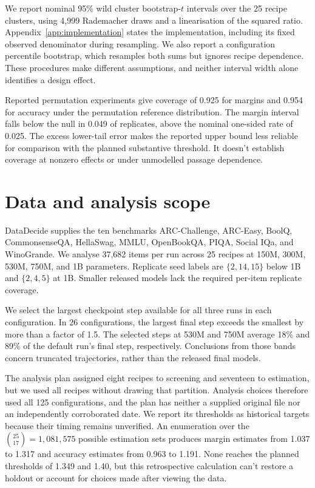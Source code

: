 \documentclass{article}
\begin{document}
We report nominal 95\% wild cluster bootstrap-$t$ intervals over the 25 recipe clusters, using 4,999 Rademacher draws and a linearisation of the squared ratio. Appendix~\ref{app:implementation} states the implementation, including its fixed observed denominator during resampling. We also report a configuration percentile bootstrap, which resamples both sums but ignores recipe dependence. These procedures make different assumptions, and neither interval width alone identifies a design effect.

Reported permutation experiments give coverage of 0.925 for margins and 0.954 for accuracy under the permutation reference distribution. The margin interval falls below the null in 0.049 of replicates, above the nominal one-sided rate of 0.025. The excess lower-tail error makes the reported upper bound less reliable for comparison with the planned substantive threshold. It doesn't establish coverage at nonzero effects or under unmodelled passage dependence.

\section{Data and analysis scope}
DataDecide supplies the ten benchmarks ARC-Challenge, ARC-Easy, BoolQ, CommonsenseQA, HellaSwag, MMLU, OpenBookQA, PIQA, Social IQa, and WinoGrande. We analyse 37,682 items per run across 25 recipes at 150M, 300M, 530M, 750M, and 1B parameters. Replicate seed labels are $\{2,14,15\}$ below 1B and $\{2,4,5\}$ at 1B. Smaller released models lack the required per-item replicate coverage.

We select the largest checkpoint step available for all three runs in each configuration. In 26 configurations, the largest final step exceeds the smallest by more than a factor of 1.5. The selected steps at 530M and 750M average 18\% and 89\% of the default run's final step, respectively. Conclusions from those bands concern truncated trajectories, rather than the released final models.

The analysis plan assigned eight recipes to screening and seventeen to estimation, but we used all recipes without drawing that partition. Analysis choices therefore used all 125 configurations, and the plan has neither a supplied original file nor an independently corroborated date. We report its thresholds as historical targets because their timing remains unverified. An enumeration over the $\binom{25}{17}=1{,}081{,}575$ possible estimation sets produces margin estimates from 1.037 to 1.317 and accuracy estimates from 0.963 to 1.191. None reaches the planned thresholds of 1.349 and 1.40, but this retrospective calculation can't restore a holdout or account for choices made after viewing the data.
\end{document}
